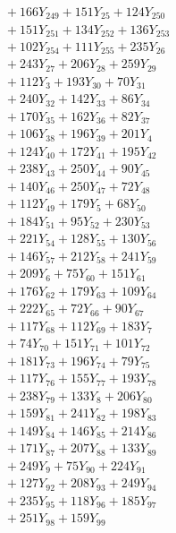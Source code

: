 \documentclass[a4paper,10pt]{article}
\begin{document}
{\begin{align}
&\quad  + 166Y_{249} + 151Y_{25} + 124Y_{250} \\[0.5ex]
&\quad  + 151Y_{251} + 134Y_{252} + 136Y_{253} \\[0.5ex]
&\quad  + 102Y_{254} + 111Y_{255} + 235Y_{26} \\[0.5ex]
&\quad  + 243Y_{27} + 206Y_{28} + 259Y_{29} \\[0.5ex]
&\quad  + 112Y_{3} + 193Y_{30} + 70Y_{31} \\[0.5ex]
&\quad  + 240Y_{32} + 142Y_{33} + 86Y_{34} \\[0.5ex]
&\quad  + 170Y_{35} + 162Y_{36} + 82Y_{37} \\[0.5ex]
&\quad  + 106Y_{38} + 196Y_{39} + 201Y_{4} \\[0.5ex]
&\quad  + 124Y_{40} + 172Y_{41} + 195Y_{42} \\[0.5ex]
&\quad  + 238Y_{43} + 250Y_{44} + 90Y_{45} \\[0.5ex]
&\quad  + 140Y_{46} + 250Y_{47} + 72Y_{48} \\[0.5ex]
&\quad  + 112Y_{49} + 179Y_{5} + 68Y_{50} \\[0.5ex]
&\quad  + 184Y_{51} + 95Y_{52} + 230Y_{53} \\[0.5ex]
&\quad  + 221Y_{54} + 128Y_{55} + 130Y_{56} \\[0.5ex]
&\quad  + 146Y_{57} + 212Y_{58} + 241Y_{59} \\[0.5ex]
&\quad  + 209Y_{6} + 75Y_{60} + 151Y_{61} \\[0.5ex]
&\quad  + 176Y_{62} + 179Y_{63} + 109Y_{64} \\[0.5ex]
&\quad  + 222Y_{65} + 72Y_{66} + 90Y_{67} \\[0.5ex]
&\quad  + 117Y_{68} + 112Y_{69} + 183Y_{7} \\[0.5ex]
&\quad  + 74Y_{70} + 151Y_{71} + 101Y_{72} \\[0.5ex]
&\quad  + 181Y_{73} + 196Y_{74} + 79Y_{75} \\[0.5ex]
&\quad  + 117Y_{76} + 155Y_{77} + 193Y_{78} \\[0.5ex]
&\quad  + 238Y_{79} + 133Y_{8} + 206Y_{80} \\[0.5ex]
&\quad  + 159Y_{81} + 241Y_{82} + 198Y_{83} \\[0.5ex]
&\quad  + 149Y_{84} + 146Y_{85} + 214Y_{86} \\[0.5ex]
&\quad  + 171Y_{87} + 207Y_{88} + 133Y_{89} \\[0.5ex]
&\quad  + 249Y_{9} + 75Y_{90} + 224Y_{91} \\[0.5ex]
&\quad  + 127Y_{92} + 208Y_{93} + 249Y_{94} \\[0.5ex]
&\quad  + 235Y_{95} + 118Y_{96} + 185Y_{97} \\[0.5ex]
&\quad  + 251Y_{98} + 159Y_{99}\nonumber
\end{align}
}
\end{document}
